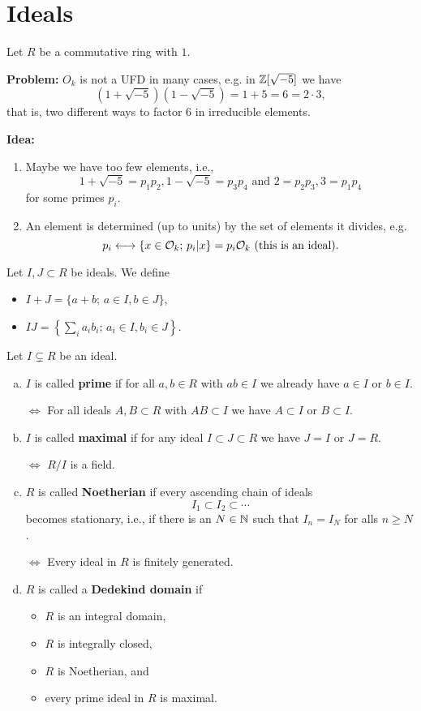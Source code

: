 \section{Ideals}
Let $R$ be a commutative ring with $1$.

\textbf{Problem:}
	$O_k$ is not a UFD in many cases, e.g. in $\mathbb{Z}[\sqrt{-5}]$ we have
	\[ (1+\sqrt{-5})(1-\sqrt{-5}) = 1+5=6=2\cdot 3,
	\]
	that is, two different ways to factor $6$ in irreducible elements.


\bigskip \textbf{Idea:}
\begin{enumerate}[(1)]
	\item Maybe we have too few elements, i.e.,
	\[ 1+\sqrt{-5} = p_1 p_2, 1-\sqrt{-5} = p_3 p_4 \text{ and }
		2=p_2p_3, 3=p_1 p_4
	\]
	for some primes $p_i$.
	\item An element is determined (up to units) by the set of elements it divides, e.g.
	\[ p_i \longleftrightarrow \{ x \in \mathcal{O}_k; \, p_i | x  \} = p_i \mathcal{O}_k \text{ (this is an ideal)}.
	\]
\end{enumerate}


\begin{Not}
	Let $I , J \subset R$ be ideals. We define
	\begin{itemize}
		\item $I+J = \{a+b; \, a \in I, b \in J  \}$,
		\item $IJ = \left\{ \sum_i a_i b_i; \, a_i \in I, b_i \in J \right\}$.
	\end{itemize}
\end{Not}

\begin{defi}
	Let $I \subsetneq R$ be an ideal.
	\begin{enumerate}[(a)]
		\item $I$ is called \textbf{prime} if for all $a,b \in R$ with $ab \in I$ we already have $a \in I$ or $b \in I$.
		
		$\Leftrightarrow$ For all ideals $A,B \subset R$ with $AB \subset I$ we have $A\subset I$ or $B \subset I$.
		\item $I$ is called \textbf{maximal} if for any ideal $I \subset J \subset R$ we have $J=I$ or $J=R$.
		
		$\Leftrightarrow$ $R/I$ is a field.
		\item $R$ is called \textbf{Noetherian} if every ascending chain of ideals
		\[ I_1 \subset I_2 \subset \cdots
		\]
		becomes stationary, i.e., if there is an $N \in \mathbb{N}$ such that $I_n = I_N$ for alls $n \geq N$.
		
		$\Leftrightarrow$ Every ideal in $R$ is finitely generated.
		\item $R$ is called a \textbf{Dedekind domain} if
		\begin{itemize}
			\item $R$ is an integral domain,
			\item $R$ is integrally closed,
			\item $R$ is Noetherian, and
			\item every prime ideal in $R$ is maximal.
		\end{itemize}
	\end{enumerate}
\end{defi}


